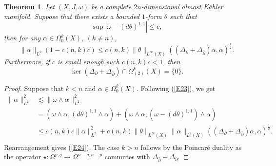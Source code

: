 \documentclass[12pt, twoside]{article}
\newtheorem{theorem}{Theorem}[section]
\theoremstyle{definition}
\numberwithin{equation}{section}
\def \a {\alpha }
\def \De {\Delta}
\def\w {\omega}
\def\Om{\Omega}
\def\pa{\partial}
\begin{document}
	\begin{theorem}\label{T5}
		Let $(X,J,\w)$ be a complete $2n$-dimensional almost K\"{a}hler manifold. Suppose that there exists a bounded $1$-form $\theta$ such that
		$$\sup|\w-(d\theta)^{1,1}|\leq c,$$
		then for any $\a\in\Om^{k}_{0}(X)$, $(k\neq n)$,
		\begin{equation}\label{E24}
		\|\a\|_{L^2}(1-c(n,k)c)\leq c(n,k)\|\theta\|_{L^{\infty}(X)}((\De_{\pa}+\De_{\bar{\pa}})\a,\a)^{\frac{1}{2}}.
		\end{equation} 
		Furthermore, if $c$ is small enough such $c(n,k)c<1$, then 
		$$\ker(\De_{\pa}+\De_{\bar{\pa}})\cap\Om^{k}_{(2)}(X)=\{0\}.$$
	\end{theorem}

	\begin{proof}
		Suppose that $k<n$ and $\a\in\Om^{k}_{0}(X)$. Following (\ref{E23}), we get
		\begin{equation*}
		\begin{split}
		\|\a\|_{L^2}^{2}&\lesssim \|\w\wedge\a\|_{L^2}^{2}\\
		&=(\w\wedge\a, (d\theta)^{1,1}\wedge\a)+(\w\wedge\a,(\w-(d\theta)^{1,1})\wedge \a)\\
		&\leq c(n,k)c\|\a\|_{L^2}^{2}+c(n,k)\|\theta\|_{L^{\infty}(X)}\|\a\|_{L^{2}(X)}((\De_{\pa}+\De_{\bar{\pa}})\a,\a)^{\frac{1}{2}}.\\
		\end{split}
		\end{equation*}
		Rearrangement gives (\ref{E24}). The case $k>n$ follows by the Poincar\'{e} duality as the operator $\star:\Om^{p,q}\rightarrow\Om^{n-q,n-p}$ commutes with $\De_{\bar{\pa}}+\De_{\pa}$.
	\end{proof}
\end{document}
